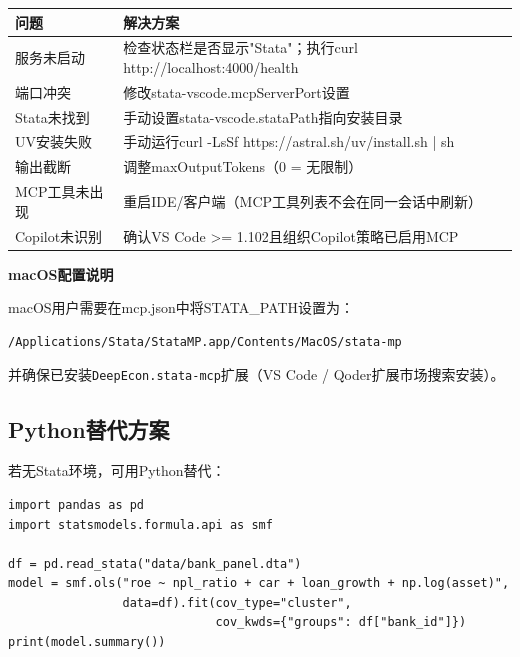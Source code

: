 \begin{table}[H]
\centering
\begin{tabular}{lp{8cm}}
\toprule
\textbf{问题} & \textbf{解决方案} \\
\midrule
服务未启动 & 检查状态栏是否显示"Stata"；执行curl http://localhost:4000/health \\
端口冲突 & 修改stata-vscode.mcpServerPort设置 \\
Stata未找到 & 手动设置stata-vscode.stataPath指向安装目录 \\
UV安装失败 & 手动运行curl -LsSf https://astral.sh/uv/install.sh | sh \\
输出截断 & 调整maxOutputTokens（0 = 无限制） \\
MCP工具未出现 & 重启IDE/客户端（MCP工具列表不会在同一会话中刷新） \\
Copilot未识别 & 确认VS Code >= 1.102且组织Copilot策略已启用MCP \\
\bottomrule
\end{tabular}
\end{table}

\textbf{macOS配置说明}

macOS用户需要在mcp.json中将STATA\_PATH设置为：

\begin{lstlisting}[style=shell]
/Applications/Stata/StataMP.app/Contents/MacOS/stata-mp
\end{lstlisting}

并确保已安装\texttt{DeepEcon.stata-mcp}扩展（VS Code / Qoder扩展市场搜索安装）。

\subsection{Python替代方案}

若无Stata环境，可用Python替代：

\begin{lstlisting}[style=python]
import pandas as pd
import statsmodels.formula.api as smf

df = pd.read_stata("data/bank_panel.dta")
model = smf.ols("roe ~ npl_ratio + car + loan_growth + np.log(asset)",
                data=df).fit(cov_type="cluster",
                             cov_kwds={"groups": df["bank_id"]})
print(model.summary())
\end{lstlisting}

